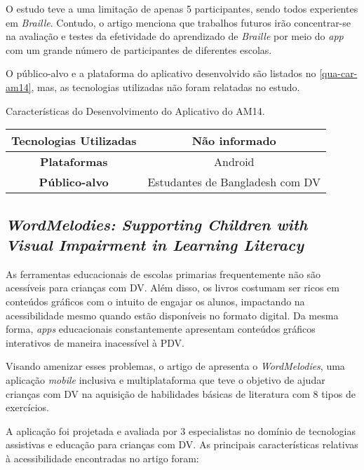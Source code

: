 O estudo teve a uma limitação de apenas 5 participantes, sendo todos experientes em \emph{Braille}.
Contudo, o artigo menciona que trabalhos futuros irão concentrar-se na avaliação e testes da efetividade do
aprendizado de \emph{Braille} por meio do \emph{app} com um grande número de participantes de diferentes escolas.

O público-alvo e a plataforma do aplicativo desenvolvido são listados no \autoref{qua-car-am14}, mas, as tecnologias utilizadas
não foram relatadas no estudo.

\begin{quadro}[htb!]
  \caption{\label{qua-car-am14}Características do Desenvolvimento do Aplicativo do AM14.}
  \begin{tabular}{|c|c|}
    \hline
    \textbf{Tecnologias Utilizadas} & Não informado                   \\ \hline
    \textbf{Plataformas}            & Android                         \\ \hline
    \textbf{Público-alvo}           & Estudantes de Bangladesh com DV \\
    \hline
  \end{tabular}
\end{quadro}

\subsection{\emph{WordMelodies: Supporting Children with Visual Impairment in Learning Literacy}}

As ferramentas educacionais de escolas primarias frequentemente não são acessíveis para crianças com DV\@.
Além disso, os livros costumam ser ricos em conteúdos gráficos com o intuito de engajar os alunos, impactando na acessibilidade mesmo quando estão disponíveis no formato digital.
Da mesma forma, \emph{apps} educacionais constantemente apresentam conteúdos gráficos interativos de maneira inacessível à PDV\@.

Visando amenizar esses problemas, o artigo de  apresenta o \emph{WordMelodies}, uma aplicação \emph{mobile}
inclusiva e multiplataforma que teve o objetivo de ajudar crianças com DV na aquisição de habilidades básicas de literatura com 8
tipos de exercícios.

A aplicação foi projetada e avaliada por 3 especialistas no domínio de tecnologias assistivas e educação
para crianças com DV\@. As principais características relativas à acessibilidade encontradas no artigo foram:

